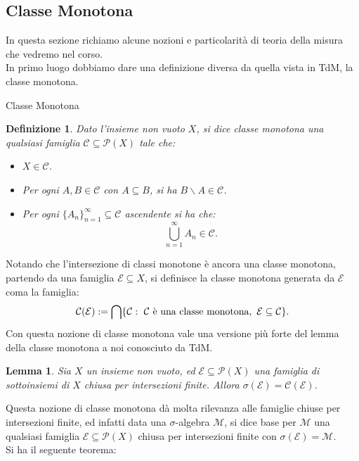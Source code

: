\documentclass[11pt]{book}
\theoremstyle{Definizione}
\newtheorem*{mydef}{Definizione}
\theoremstyle{TeoremaProposizioneLemmaCorollario}
\newtheorem{mylem}[myteo]{Lemma}
\theoremstyle{OsservazioneNota}
\newcommand{\tolto}{\smallsetminus}
\newcommand{\parti}[1]{\mathcal{P}\left({#1}\right)}
\begin{document}
\subsection{Classe Monotona}
In questa sezione richiamo alcune nozioni e particolarità di teoria della misura che vedremo nel corso.\\
In primo luogo dobbiamo dare una definizione diversa da quella vista in TdM, la classe monotona.
\begin{boxdef}{Classe Monotona}
\begin{mydef}
Dato l'insieme non vuoto $X$, si dice classe monotona una qualsiasi famiglia $\mathcal{C}\subseteq \parti{X}$ tale che:
\begin{itemize}
\item[$(i)$] $X\in \mathcal{C}$.
\item[$(ii)$] Per ogni $A,B\in \mathcal{C}$ con $A\subseteq B$, si ha $B\tolto A \in \mathcal{C}$.
\item[$(iii)$] Per ogni $\{A_n\}_{n = 1}^\infty \subseteq \mathcal{C}$ ascendente si ha che:
$$
\bigcup_{n = 1}^\infty A_n \in \mathcal{C}.
$$
\end{itemize}
\end{mydef}
\end{boxdef}
\noindent
Notando che l'intersezione di classi monotone è ancora una classe monotona, partendo da una famiglia $\mathcal{E}\subseteq X$, si definisce la classe monotona generata da $\mathcal{E}$ coma la famiglia:
$$
\mathcal{C}(\mathcal{E}):= \bigcap \{\mathcal{C}:\ \mathcal{C}\textup{ è una classe monotona}, \ \mathcal{E}\subseteq \mathcal{C}\}.
$$
Con questa nozione di classe monotona vale una versione più forte del lemma della classe monotona a noi conosciuto da TdM.
\begin{boxoss}
\begin{mylem}
Sia $X$ un insieme non vuoto, ed $\mathcal{E}\subseteq \parti{X}$ una famiglia di sottoinsiemi di $X$ chiusa per intersezioni finite. Allora $\sigma(\mathcal{E}) = \mathcal{C}(\mathcal{E})$.
\end{mylem}
\end{boxoss}
\noindent
Questa nozione di classe monotona dà molta rilevanza alle famiglie chiuse per intersezioni finite, ed infatti data una $\sigma$-algebra $\mathcal{M}$, si dice base per $\mathcal{M}$ una qualsiasi famiglia $\mathcal{E}\subseteq \parti{X}$ chiusa per intersezioni finite con $\sigma(\mathcal{E}) = \mathcal{M}$.\\
Si ha il seguente teorema:
\end{document}
